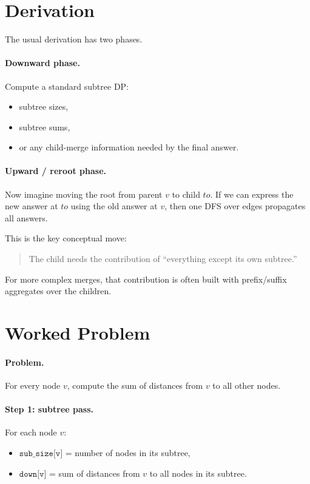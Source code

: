 \section*{Derivation}

The usual derivation has two phases.

\paragraph{Downward phase.}
Compute a standard subtree DP:

\begin{itemize}
  \item subtree sizes,
  \item subtree sums,
  \item or any child-merge information needed by the final answer.
\end{itemize}

\paragraph{Upward / reroot phase.}
Now imagine moving the root from parent \(v\) to child \(to\). If we can express the new answer at \(to\) using the old
answer at \(v\), then one DFS over edges propagates all answers.

This is the key conceptual move:

\begin{quote}
The child needs the contribution of ``everything except its own subtree.''
\end{quote}

For more complex merges, that contribution is often built with prefix/suffix aggregates over the children.

\section*{Worked Problem}

\paragraph{Problem.}
For every node \(v\), compute the sum of distances from \(v\) to all other nodes.

\paragraph{Step 1: subtree pass.}
For each node \(v\):

\begin{itemize}
  \item \(\texttt{sub\_size[v]}\) = number of nodes in its subtree,
  \item \(\texttt{down[v]}\) = sum of distances from \(v\) to all nodes in its subtree.
\end{itemize}

